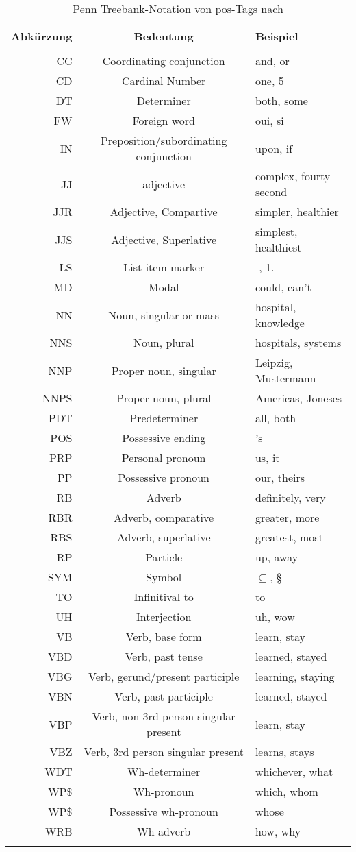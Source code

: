 \begin{longtable}{r c l}
  \toprule
  Abkürzung & Bedeutung & Beispiel \\
  \midrule \\
  \endhead
  CC & Coordinating conjunction & and, or \\
  CD & Cardinal Number & one, 5 \\
  DT & Determiner & both, some \\
  FW & Foreign word & oui, si \\
  IN & Preposition/subordinating conjunction & upon, if \\
  JJ & adjective & complex, fourty-second \\
  JJR & Adjective, Compartive & simpler, healthier \\
  JJS & Adjective, Superlative &  simplest, healthiest \\
  LS & List item marker & -, 1. \\
  MD & Modal & could, can't \\
  NN & Noun, singular or mass & hospital, knowledge \\
  NNS & Noun, plural & hospitals, systems \\
  NNP & Proper noun, singular & Leipzig, Mustermann \\
  NNPS & Proper noun, plural & Americas, Joneses \\
  PDT & Predeterminer & all, both \\
  POS & Possessive ending & 's \\
  PRP & Personal pronoun & us, it \\
  PP & Possessive pronoun & our, theirs \\
  RB & Adverb & definitely, very \\
  RBR & Adverb, comparative & greater, more \\
  RBS & Adverb, superlative & greatest, most \\
  RP & Particle & up, away \\
  SYM & Symbol & $\subseteq$, § \\
  TO & Infinitival to & to \\
  UH & Interjection & uh, wow \\
  VB & Verb, base form & learn, stay \\
  VBD & Verb, past tense & learned, stayed \\
  VBG & Verb, gerund/present participle & learning, staying \\
  VBN & Verb, past participle & learned, stayed \\
  VBP & Verb, non-3rd person singular present & learn, stay \\
  VBZ & Verb, 3rd person singular present & learns, stays \\
  WDT & Wh-determiner & whichever, what \\
  WP\$ & Wh-pronoun & which, whom \\
  WP\$ & Possessive wh-pronoun & whose \\
  WRB & Wh-adverb & how, why \\
  \bottomrule
  \caption[Penn Treebank-Notation von POS-Tags]{Penn Treebank-Notation von \acs{pos}-Tags nach \citet{penntreebankpos}}
  \label{tab:penntreebankpos}
\end{longtable}

